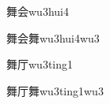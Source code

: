 \begin{verbete}[14;6]{舞会}{wu3hui4}
\end{verbete}

\begin{verbete}[14;6;14]{舞会舞}{wu3hui4wu3}
\end{verbete}

\begin{verbete}[14;4]{舞厅}{wu3ting1}
\end{verbete}

\begin{verbete}[14;4;14]{舞厅舞}{wu3ting1wu3}
\end{verbete}


